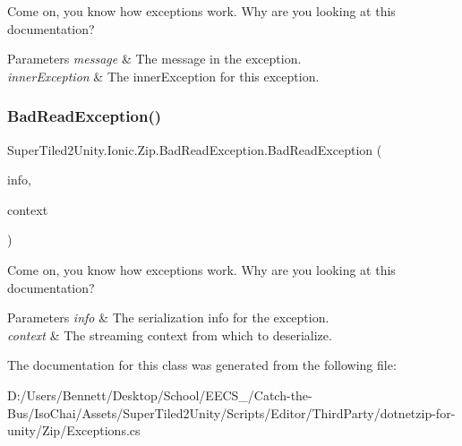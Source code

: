Come on, you know how exceptions work. Why are you looking at this documentation? 


\begin{DoxyParams}{Parameters}
{\em message} & The message in the exception.\\
\hline
{\em inner\+Exception} & The inner\+Exception for this exception.\\
\hline
\end{DoxyParams}
\mbox{\label{class_super_tiled2_unity_1_1_ionic_1_1_zip_1_1_bad_read_exception_af4a1bba107069a8a3b3ca2434a8645d3}} 
\subsubsection{\texorpdfstring{Bad\+Read\+Exception()}{BadReadException()}\hspace{0.1cm}{\footnotesize\ttfamily [4/4]}}
{\footnotesize\ttfamily Super\+Tiled2\+Unity.\+Ionic.\+Zip.\+Bad\+Read\+Exception.\+Bad\+Read\+Exception (\begin{DoxyParamCaption}\item[{Serialization\+Info}]{info,  }\item[{Streaming\+Context}]{context }\end{DoxyParamCaption})\hspace{0.3cm}{\ttfamily [protected]}}



Come on, you know how exceptions work. Why are you looking at this documentation? 


\begin{DoxyParams}{Parameters}
{\em info} & The serialization info for the exception.\\
\hline
{\em context} & The streaming context from which to deserialize.\\
\hline
\end{DoxyParams}


The documentation for this class was generated from the following file\+:\begin{DoxyCompactItemize}
\item 
D\+:/\+Users/\+Bennett/\+Desktop/\+School/\+E\+E\+C\+S\+\_/\+Catch-\/the-\/\+Bus/\+Iso\+Chai/\+Assets/\+Super\+Tiled2\+Unity/\+Scripts/\+Editor/\+Third\+Party/dotnetzip-\/for-\/unity/\+Zip/Exceptions.\+cs\end{DoxyCompactItemize}
